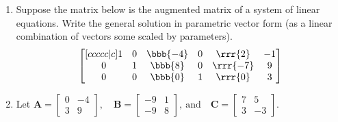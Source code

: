 \documentclass[basic]{inVerba-notes}
\begin{document}
\begin{enumerate}[align=left, leftmargin=0pt, labelindent=\parindent, listparindent=\parindent, labelwidth=0pt, itemindent=!]
  \item {} Suppose the matrix below is the augmented matrix of a system of linear equations. Write the general solution in parametric vector form (as a linear combination of vectors some scaled by parameters).
  \[%
  \begin{bmatrix}[ccccc|c]
  1 & 0 & \bbb{-4}  & 0 & \rrr{2} & -1  \\
  0 & 1 & \bbb{8 } & 0 & \rrr{-7} & 9  \\
  0 & 0 & \bbb{0 } & 1 & \rrr{0} & 3  
  \end{bmatrix}
  \]%
  \basec{\[%
  \begin{bmatrix} x_1 \\ x_2  \\ \bbb{x_3} \\ x_4 \\ \rrr{x_5} \end{bmatrix}
  = 
  \begin{bmatrix} -1 \\ 9 \\ \bbb{0} \\ 3 \\ \rrr{0} \end{bmatrix}
  + r
  \begin{bmatrix} 4 \\ -8 \\ \bbb{1} \\ 0 \\ \rrr{0} \end{bmatrix}
  + s
  \begin{bmatrix} -2 \\ 7 \\ \bbb{0} \\ 0 \\ \rrr{1} \end{bmatrix}
  \]}%
  
  \bigskip
  
  \item {} Let
  \(%
  \bm{A} = \begin{bmatrix} 0 & -4 \\ 3 & 9 \end{bmatrix},
  \quad \bm{B} = \begin{bmatrix} -9 & 1  \\ -9 & 8 \end{bmatrix},~\text{and}
  \quad \bm{C} = \begin{bmatrix} 7 & 5 \\ 3 & -3 \end{bmatrix}.
  \)%
  

\end{enumerate}
\end{document}
